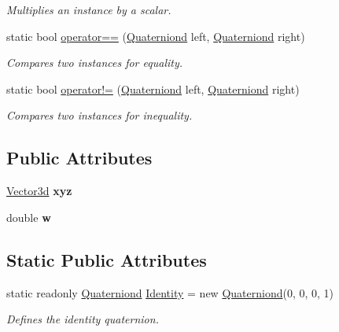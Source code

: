 \begin{DoxyCompactItemize}
\begin{DoxyCompactList}\small\item\em Multiplies an instance by a scalar. \end{DoxyCompactList}\item 
static bool \hyperlink{struct_open_t_k_1_1_quaterniond_a0bed8bc84dab19ea64a98412aface866}{operator==} (\hyperlink{struct_open_t_k_1_1_quaterniond}{Quaterniond} left, \hyperlink{struct_open_t_k_1_1_quaterniond}{Quaterniond} right)
\begin{DoxyCompactList}\small\item\em Compares two instances for equality. \end{DoxyCompactList}\item 
static bool \hyperlink{struct_open_t_k_1_1_quaterniond_ab712946b78898ef4a054d5a18891a817}{operator!=} (\hyperlink{struct_open_t_k_1_1_quaterniond}{Quaterniond} left, \hyperlink{struct_open_t_k_1_1_quaterniond}{Quaterniond} right)
\begin{DoxyCompactList}\small\item\em Compares two instances for inequality. \end{DoxyCompactList}\end{DoxyCompactItemize}
\subsection*{Public Attributes}
\begin{DoxyCompactItemize}
\item 
\hypertarget{struct_open_t_k_1_1_quaterniond_a8c3288352505ef3e1aa87278d08fc129}{\hyperlink{struct_open_t_k_1_1_vector3d}{Vector3d} {\bfseries xyz}}\label{struct_open_t_k_1_1_quaterniond_a8c3288352505ef3e1aa87278d08fc129}

\item 
\hypertarget{struct_open_t_k_1_1_quaterniond_a3483a6660a55ce2def20bbe60a4da48d}{double {\bfseries w}}\label{struct_open_t_k_1_1_quaterniond_a3483a6660a55ce2def20bbe60a4da48d}

\end{DoxyCompactItemize}
\subsection*{Static Public Attributes}
\begin{DoxyCompactItemize}
\item 
static readonly \hyperlink{struct_open_t_k_1_1_quaterniond}{Quaterniond} \hyperlink{struct_open_t_k_1_1_quaterniond_af8196c63aab195c3582028951e7d093a}{Identity} = new \hyperlink{struct_open_t_k_1_1_quaterniond}{Quaterniond}(0, 0, 0, 1)
\begin{DoxyCompactList}\small\item\em Defines the identity quaternion. \end{DoxyCompactList}\end{DoxyCompactItemize}
